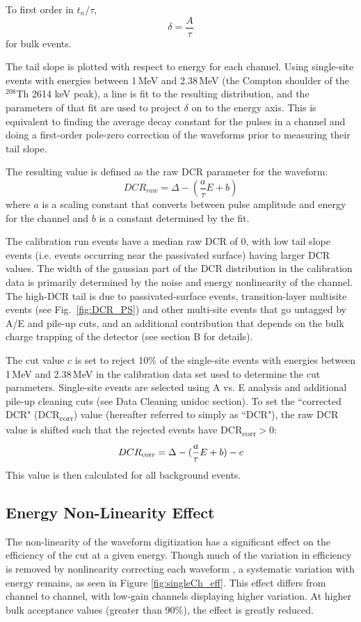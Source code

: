 To first order in $t_n/\tau$, 
$$\delta = \frac{A}{\tau}$$
for bulk events. 

The tail slope is plotted with respect to energy for each channel. Using single-site events with energies between 1\,MeV and 2.38\,MeV (the Compton shoulder of the $^{208}$Th 2614 keV peak), a line is fit to the resulting distribution, and the parameters of that fit are used to project $\delta$ on to the energy axis. This is equivalent to finding the average decay constant for the pulses in a channel and doing a first-order pole-zero correction of the waveforms prior to measuring their tail slope. 

The resulting value is defined as the raw DCR parameter for the waveform:
$$\mathit{DCR_{raw}} = \Delta - (\frac{a}{\tau}E+b)$$
where $a$ is a scaling constant that converts between pulse amplitude and energy for the channel and $b$ is a constant determined by the fit. 

The calibration run events have a median raw DCR of 0, with low tail slope events (i.e. events occurring near the passivated surface) having larger DCR values. The width of the gaussian part of the DCR distribution in the calibration data is primarily determined by the noise and energy nonlinearity of the channel. The high-DCR tail is due to passivated-surface events, transition-layer multisite events (see Fig.~\ref{fig:DCR_PS}) and other multi-site events that go untagged by A/E and pile-up cuts, and an additional contribution that depends on the bulk charge trapping of the detector (see section B for details). 

The cut value $c$ is set to reject 10\% of the single-site events with energies between 1\,MeV and 2.38\,MeV in the calibration data set used to determine the cut parameters. Single-site events are selected using  A vs. E analysis and additional pile-up cleaning cuts (see Data Cleaning unidoc section).
To set the ``corrected DCR" (DCR\textsubscript{corr}) value (hereafter referred to simply as ``DCR"), the raw DCR value is shifted such that the rejected events have DCR\textsubscript{corr}$>0$:
$$DCR\textsubscript{corr} = \Delta - (\frac{a}{\tau}E+b) - c$$
This value is then calculated for all background events. 


\subsection{Energy Non-Linearity Effect}
The non-linearity of the waveform digitization has a significant effect on the efficiency of the cut at a given energy. Though much of the variation in efficiency is removed by nonlinearity correcting each waveform \cite{EnergyUnidoc}, a systematic variation with energy remains, as seen in Figure \ref{fig:singleCh_eff}. This effect differs from channel to channel, with low-gain channels displaying higher variation. At higher bulk acceptance values (greater than 90\%), the effect is greatly reduced.

